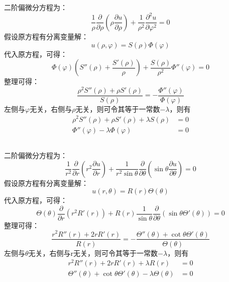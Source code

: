 \documentclass[10.5pt]{article}
\begin{document}
\subsection{}
二阶偏微分方程为：$$\frac{1}{\rho}\frac{\partial}{\partial\rho}\left(\rho\frac{\partial u}{\partial \rho}\right)+\frac{1}{\rho^2}\frac{\partial^2u}{\partial\varphi^2}=0$$\indent
假设原方程有分离变量解：$$u(\rho,\varphi)=S(\rho)\Phi(\varphi)$$\indent
代入原方程，可得：$$\Phi(\varphi)\left(S''(\rho)+\frac{S'(\rho)}{\rho}\right)+\frac{S(\rho)}{\rho^2}\Phi''(\varphi)=0$$\indent
整理可得：$$\frac{\rho^2S''(\rho)+\rho S'(\rho)}{S(\rho)}=-\frac{\Phi''(\varphi)}{\Phi(\varphi)}$$\indent
左侧与$\varphi$无关，右侧与$\rho$无关，则可令其等于一常数$-\lambda$，则有$$\begin{aligned}
    \rho^2S''(\rho)+\rho S'(\rho)+\lambda S(\rho)
    &=0\\
    \Phi''(\varphi)-\lambda\Phi(\varphi)&=0
\end{aligned}$$
\subsection{}
二阶偏微分方程为：$$\frac{1}{r^2}\frac{\partial}{\partial r}\left(r^2\frac{\partial u}{\partial r}\right)+\frac{1}{r^2\sin\theta}\frac{\partial}{\partial\theta}\left(\sin\theta\frac{\partial u}{\partial\theta}\right)=0$$\indent
假设原方程有分离变量解：$$u(r,\theta)=R(r)\Theta(\theta)$$\indent
代入原方程，可得：$$\Theta(\theta)\frac{\partial}{\partial r}\left(r^2R'(r)\right)+R(r)\frac{1}{\sin\theta}\frac{\partial}{\partial\theta}\left(\sin\theta\Theta'(\theta)\right)=0$$\indent
整理可得：$$\frac{r^2R''(r)+2rR'(r)}{R(r)}=-\frac{\Theta''(\theta)+\cot\theta\Theta'(\theta)}{\Theta(\theta)}$$\indent
左侧与$\theta$无关，右侧与r无关，则可令其等于一常数$-\lambda$，则有$$\begin{aligned}
    r^2R''(r)+2rR'(r)+\lambda R(r)&=0\\
    \Theta''(\theta)+\cot\theta\Theta'(\theta)-\lambda\Theta(\theta)&=0
\end{aligned}$$
\end{document}

